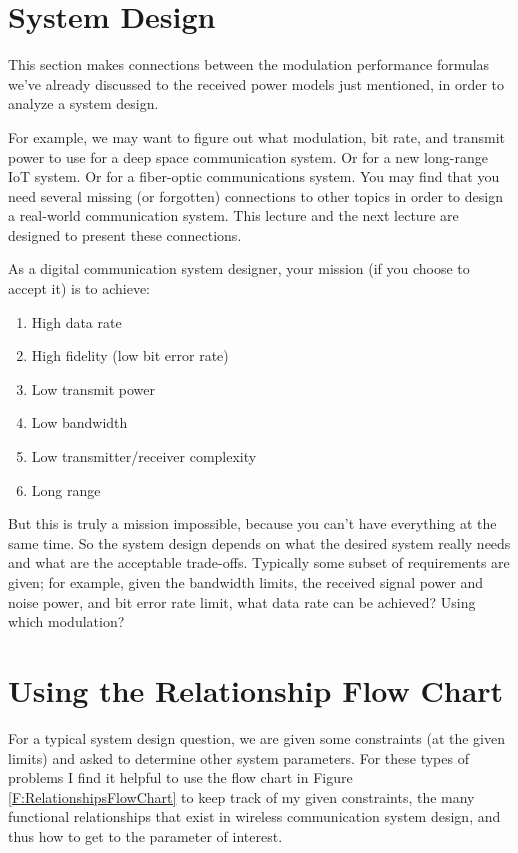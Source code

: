 \section{System Design}
This section makes connections between the modulation performance formulas we've already discussed to the received power models just mentioned, in order to analyze a system design. 

For example, we may want to figure out what modulation, bit rate, and transmit power to use for a deep space communication system.  Or for a new long-range IoT system.  Or for a fiber-optic communications system.  You may find that you need several missing (or forgotten) connections to other topics in order to design a real-world communication system.  This lecture and the next lecture are designed to present these connections. 

As a digital communication system designer, your mission (if you choose to accept it) is to achieve:
\begin{enumerate}
 \item High data rate
 \item High fidelity (low bit error rate)
 \item Low transmit power 
 \item Low bandwidth
 \item Low transmitter/receiver complexity
 \item Long range
\end{enumerate}
But this is truly a mission impossible, because you can't have everything at the same time.  So the system design depends on what the desired system really needs and what are the acceptable trade-offs.  Typically some subset of requirements are given; for example, given the bandwidth limits, the received signal power and noise power, and bit error rate limit, what data rate can be achieved?  Using which modulation?

\section{Using the Relationship Flow Chart}

For a typical system design question, we are given some constraints (at the given limits) and asked to determine other system parameters.  For these types of problems I find it helpful to use the flow chart in Figure \ref{F:RelationshipsFlowChart} to keep track of my given constraints, the many functional relationships that exist in wireless communication system design, and thus how to get to the parameter of interest.  


